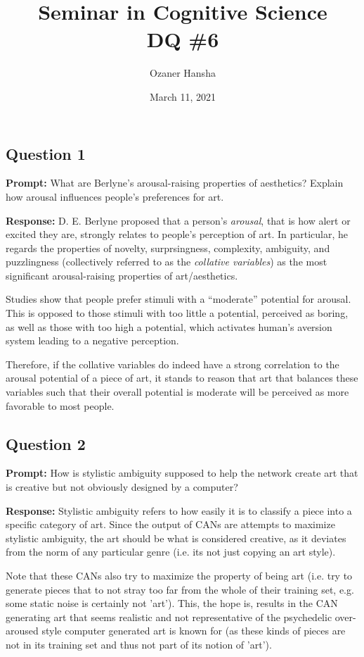 \documentclass{article}
\begin{document}
\title{Seminar in Cognitive Science\\ DQ \#6}
\author{Ozaner Hansha}
\date{March 11, 2021}
\maketitle

\subsection*{Question 1}
\noindent\textbf{Prompt:} What are Berlyne's arousal-raising properties of aesthetics? Explain how arousal influences people’s preferences for art.
\bigskip

\noindent\textbf{Response:} D. E. Berlyne proposed that a person's \textit{arousal}, that is how alert or excited they are, strongly relates to people's perception of art. In particular, he regards the properties of novelty, surprsingness, complexity, ambiguity, and puzzlingness (collectively referred to as the \textit{collative variables}) as the most significant arousal-raising properties of art/aesthetics.

Studies show that people prefer stimuli with a ``moderate'' potential for arousal. This is opposed to those stimuli with too little a potential, perceived as boring, as well as those with too high a potential, which activates human's aversion system leading to a negative perception.

Therefore, if the collative variables do indeed have a strong correlation to the arousal potential of a piece of art, it stands to reason that art that balances these variables such that their overall potential is moderate will be perceived as more favorable to most people. 

\subsection*{Question 2}
\noindent\textbf{Prompt:} How is stylistic ambiguity supposed to help the network create art that is creative but not obviously designed by a computer?
\bigskip

\noindent\textbf{Response:} Stylistic ambiguity refers to how easily it is to classify a piece into a specific category of art. Since the output of CANs are attempts to maximize stylistic ambiguity, the art should be what is considered creative, as it deviates from the norm of any particular genre (i.e. its not just copying an art style).

Note that these CANs also try to maximize the property of being art (i.e. try to generate pieces that to not stray too far from the whole of their training set, e.g. some static noise is certainly not 'art'). This, the hope is, results in the CAN generating art that seems realistic and not representative of the psychedelic over-aroused style computer generated art is known for (as these kinds of pieces are not in its training set and thus not part of its notion of 'art').
\end{document}
